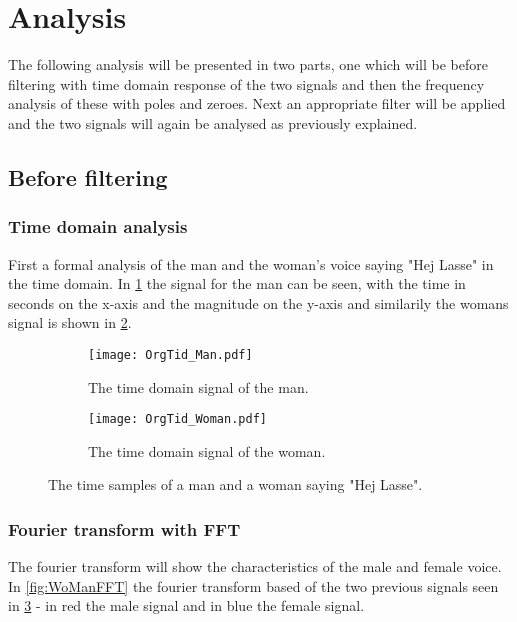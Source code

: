 
\section{Analysis}
\label{sec:analysis}
The following analysis will be presented in two parts, one which will be before filtering with time domain response of the two signals and then the frequency analysis of these with poles and zeroes. Next an appropriate filter will be applied and the two signals will again be analysed as previously explained.

\subsection{Before filtering}

\subsubsection{Time domain analysis}

First a formal analysis of the man and the woman's voice saying "Hej Lasse" in the time domain. In \cref{fig:time_man} the signal for the man can be seen, with the time in seconds on the x-axis and the magnitude on the y-axis and similarily the womans signal is shown in \cref{fig:time_woman}.

\begin{figure}[h]
	\centering
	\begin{subfigure}{0.45\textwidth}
		\texttt{[image: OrgTid\_Man.pdf]}
		\caption{The time domain signal of the man.}
		\label{fig:time_man}
	\end{subfigure}
	\quad
	\begin{subfigure}{0.45\textwidth}
		\texttt{[image: OrgTid\_Woman.pdf]}
		\caption{The time domain signal of the woman.}
		\label{fig:time_woman}
	\end{subfigure}
	\caption{The time samples of a man and a woman saying "Hej Lasse".}
	\label{fig:time_WoMan}
\end{figure}

\subsubsection{Fourier transform with FFT}

The fourier transform will show the characteristics of the male and female voice. In \cref{fig:WoManFFT} the fourier transform based of the two previous signals seen in \cref{fig:time_WoMan} - in red the male signal and in blue the female signal.

